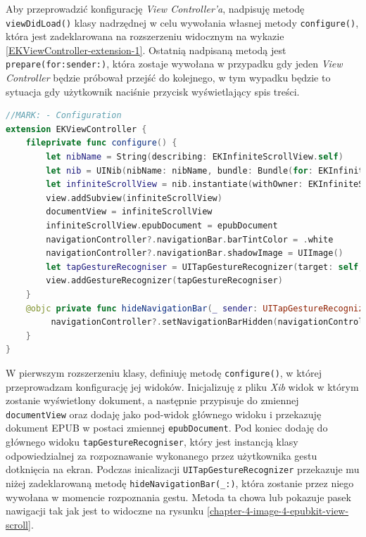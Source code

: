 Aby przeprowadzić konfigurację \textit{View Controller’a}, nadpisuję metodę \texttt{viewDidLoad()} klasy nadrzędnej w celu wywołania własnej metody \texttt{configure()}, która jest zadeklarowana na rozszerzeniu widocznym na wykazie \ref{EKViewController-extension-1}. Ostatnią nadpisaną metodą jest \texttt{prepare(for:sender:)}, która zostaje wywołana w przypadku gdy jeden \textit{View Controller} będzie próbował przejść do kolejnego, w tym wypadku będzie to sytuacja gdy użytkownik naciśnie przycisk wyświetlający spis treści.

\begin{lstlisting}[language=swift,caption={Rozszerzenie klasy texttt{EKViewController} o metody konfiguracji},label=EKViewController-extension-1]
//MARK: - Configuration
extension EKViewController {
    fileprivate func configure() {
        let nibName = String(describing: EKInfiniteScrollView.self)
        let nib = UINib(nibName: nibName, bundle: Bundle(for: EKInfiniteScrollView.classForCoder()))
        let infiniteScrollView = nib.instantiate(withOwner: EKInfiniteScrollView.self, options: nil).first as! EKInfiniteScrollView
        view.addSubview(infiniteScrollView)
        documentView = infiniteScrollView
        infiniteScrollView.epubDocument = epubDocument
        navigationController?.navigationBar.barTintColor = .white
        navigationController?.navigationBar.shadowImage = UIImage()
        let tapGestureRecogniser = UITapGestureRecognizer(target: self, action: #selector(hideNavigationBar(_:)))
        view.addGestureRecognizer(tapGestureRecogniser)
    }
    @objc private func hideNavigationBar(_ sender: UITapGestureRecognizer){
         navigationController?.setNavigationBarHidden(navigationController?.isNavigationBarHidden == false, animated: true)
    }
}
\end{lstlisting}

W pierwszym rozszerzeniu klasy, definiuję metodę \texttt{configure()}, w której przeprowadzam konfigurację jej widoków. Inicjalizuję z pliku \textit{Xib} widok w którym zostanie wyświetlony dokument, a następnie przypisuje do zmiennej \texttt{documentView} oraz dodaję jako pod-widok głównego widoku i przekazuję dokument EPUB w postaci zmiennej \texttt{epubDocument}. Pod koniec dodaję do głównego widoku \texttt{tapGestureRecogniser}, który jest instancją klasy odpowiedzialnej za rozpoznawanie wykonanego przez użytkownika gestu dotknięcia na ekran. Podczas inicalizacji \texttt{UITapGestureRecognizer} przekazuje mu niżej zadeklarowaną metodę \texttt{hideNavigationBar(\_:)}, która zostanie przez niego wywołana w momencie rozpoznania gestu. Metoda ta chowa lub pokazuje pasek nawigacji tak jak jest to widoczne na rysunku \ref{chapter-4-image-4-epubkit-view-scroll}.

